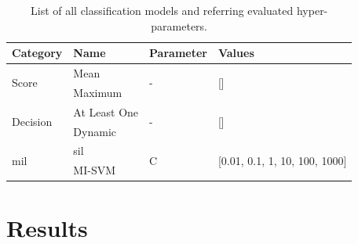 \documentclass[journal,article,submit,moreauthors,pdftex, applsci]{Definitions/mdpi}
\begin{document}
\begin{table}[]
    \centering
    \begin{tabular}{llll}
    \textbf{Category}               & \textbf{Name}     & \textbf{Parameter}& \textbf{Values}                                   \\ \hline
    \multirow{2}{*}{Score}          & Mean              & \multirow{2}{*}{-}& \multirow{2}{*}{[]}                               \\ \cline{2-2}
                                    & Maximum           &                   &                                                   \\ \hline 
    \multirow{2}{*}{Decision}       & At Least One      & \multirow{2}{*}{-}& \multirow{2}{*}{[]}                               \\ \cline{2-2}
                                    & Dynamic           &                   &                                                   \\ \hline 
    \multirow{2}{*}{\ac{mil}}       & \ac{sil}          & \multirow{2}{*}{C}& \multirow{2}{*}{[0.01, 0.1, 1, 10, 100, 1000]}    \\ \cline{2-2}
                                    & MI-SVM            &                   &                                                   \\ \hline 
    \end{tabular}    
    \caption{List of all classification models and referring evaluated hyper-parameters.}
    \label{tab:patient_hyperparameters}
\end{table}
\par


\section{Results}
\label{sec:results}
\end{document}
